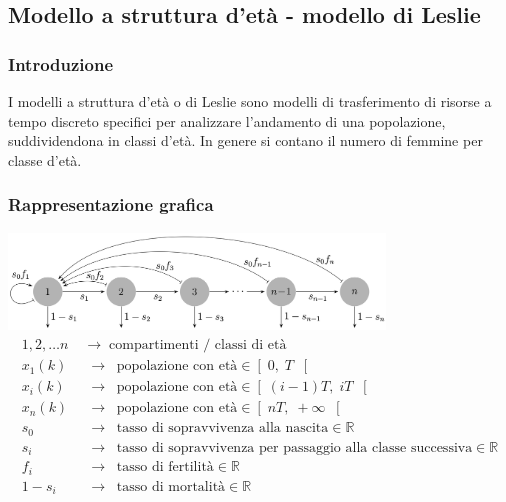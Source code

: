 \newpage

\subsection{Modello a struttura d'età - modello di Leslie}
\subsubsection*{Introduzione}
I modelli a struttura d'età o di Leslie sono modelli di trasferimento di risorse a tempo discreto specifici per analizzare l'andamento
di una popolazione, suddividendona in classi d'età. In genere si contano il numero di femmine per classe d'età.

\subsubsection*{Rappresentazione grafica}
\begin{center}
	\includegraphics[width=0.75\textwidth]{modelli/modello leslie.png}
	\begin{align*}
		1,2, \dots n \;\; &\rightarrow \;\; \text{compartimenti / classi di età} \\
		x_1(k) \;\; &\rightarrow \;\; \text{popolazione con età} \in \left[ \; 0, \;T \; \right[ \\
		x_i(k) \;\; &\rightarrow \;\; \text{popolazione con età} \in \left[ \; (i-1)T, \;iT \; \right[ \\
		x_n(k) \;\; &\rightarrow \;\; \text{popolazione con età} \in \left[ \; nT, \; +\infty \; \right[ \\
		s_0 \;\; &\rightarrow \;\; \text{tasso di sopravvivenza alla nascita} \in \mathbb{R} \\
		s_i \;\; &\rightarrow \;\; \text{tasso di sopravvivenza per passaggio alla classe successiva} \in \mathbb{R} \\
		f_i \;\; &\rightarrow \;\; \text{tasso di fertilità} \in \mathbb{R} \\
		1-s_i \;\; &\rightarrow \;\; \text{tasso di mortalità} \in \mathbb{R}
	\end{align*}
\end{center}

